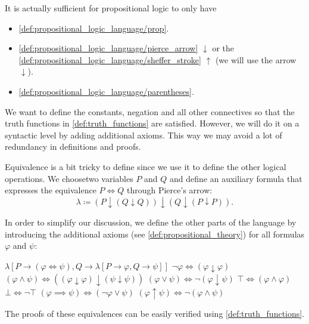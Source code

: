 \begin{note}\label{note:minimal_propositional_language}
  It is actually sufficient for propositional logic to only have
  \begin{itemize}
    \item \ref{def:propositional_logic_language/prop}.
    \item \ref{def:propositional_logic_language/pierce_arrow} \( \downarrow \) or the \ref{def:propositional_logic_language/sheffer_stroke} \( \uparrow \) (we will use the arrow \( \downarrow \)).
    \item \ref{def:propositional_logic_language/parentheses}.
  \end{itemize}

  We want to define the constants, negation and all other connectives so that the truth functions in \cref{def:truth_functions} are satisfied. However, we will do it on a syntactic level by adding additional axioms. This way we may avoid a lot of redundancy in definitions and proofs.

  Equivalence is a bit tricky to define since we use it to define the other logical operations. We choose\AOC two variables \( P \) and \( Q \) and define an auxiliary formula that expresses the equivalence \( P \iff Q \) through Pierce's arrow:
  \begin{equation*}
    \lambda \coloneqq (P \downarrow (Q \downarrow Q)) \downarrow (Q \downarrow (P \downarrow P)).
  \end{equation*}

  In order to simplify our discussion, we define the other parts of the language by introducing the additional axioms (see \cref{def:propositional_theory}) for all formulas \( \varphi \) and \( \psi \):
  \begin{description}
     \( \lambda[P \to (\varphi \iff \psi), Q \to \lambda[P \to \varphi, Q \to \psi]] \)
     \( \neg \varphi \iff (\varphi \downarrow \varphi) \)
     \( (\varphi \land \psi) \iff ((\varphi \downarrow \varphi) \downarrow (\psi \downarrow \psi)) \)
     \( (\varphi \lor \psi) \iff \neg (\varphi \downarrow \psi) \)
     \( \top \iff (\varphi \land \varphi) \)
     \( \bot \iff \neg \top \)
     \( (\varphi \implies \psi) \iff (\neg \varphi \lor \psi) \)
     \( (\varphi \uparrow \psi) \iff \neg (\varphi \land \psi) \)
  \end{description}

  The proofs of these equivalences can be easily verified using \cref{def:truth_functions}.
\end{note}


